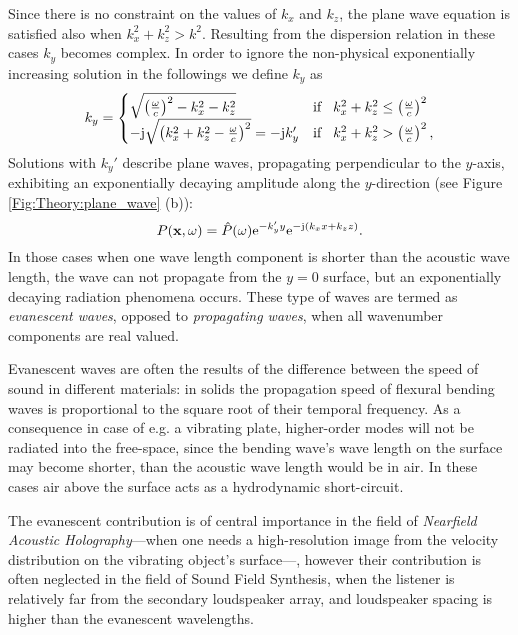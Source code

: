 Since there is no constraint on the values of $k_x$ and $k_z$, the plane wave equation is satisfied also when $k_x^2 + k_z^2 > k^2$. Resulting from the dispersion relation in these cases $k_y$ becomes complex.
In order to ignore the non-physical exponentially increasing solution in the followings we define $k_y$ as 
\begin{equation}
k_y = \begin{cases}
                       \sqrt{\left(\frac{\omega}{c}\right)^2 - k_x^2 - k_z^2}  & \text{if} \hspace{3mm} k_x^2 + k_z^2 \leq \left(\frac{\omega}{c}\right)^2\\
                      -\mathrm{j} \sqrt{\left(k_x^2+k_z^2 - \frac{\omega}{c}\right)^2 } = -\mathrm{j} k_y' &  \text{if} \hspace{3mm} k_x^2 + k_z^2 > \left(\frac{\omega}{c}\right)^2,
                 \end{cases}
\label{eq:theory:k_y_definition}
\end{equation}
Solutions with $k_y'$ describe plane waves, propagating perpendicular to the $y$-axis, exhibiting an exponentially decaying amplitude along the $y$-direction (see Figure \ref{Fig:Theory:plane_wave} (b)):
 \begin{equation}
 P(\mathbf{x},\omega) = \hat{P}(\omega) \mathrm{e}^{-k_y' y} \mathrm{e}^{-\mathrm{j} \left( k_x x + k_z z \right) }.
 \end{equation}
In those cases when one wave length component is shorter than the acoustic wave length, the wave can not propagate from the $y = 0$ surface, but an exponentially decaying radiation phenomena occurs. These type of waves are termed as \emph{evanescent waves}, opposed to \emph{propagating waves}, when all wavenumber components are real valued.
 
Evanescent waves are often the results of the difference between the speed of sound in different materials: in solids the propagation speed of flexural bending waves is proportional to the square root of their temporal frequency. As a consequence in case of e.g. a vibrating plate, higher-order modes will not be radiated into the free-space, since the bending wave's wave length on the surface may become shorter, than the acoustic wave length would be in air. In these cases air above the surface acts as a hydrodynamic short-circuit.

The evanescent contribution is of central importance in the field of \emph{Nearfield Acoustic Holography}---when one needs a high-resolution image from the velocity distribution on the vibrating object's surface---, however their contribution is often neglected in the field of Sound Field Synthesis, when the listener is relatively far from the secondary loudspeaker array, and loudspeaker spacing is higher than the evanescent wavelengths.
 

